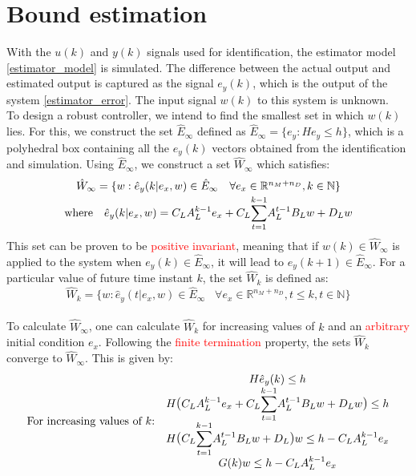 \documentclass[a4paper]{article}
\begin{document}
\section{Bound estimation}
With the $u(k)$ and $y(k)$ signals used for identification, the estimator model \eqref{estimator_model} is simulated. The difference between the actual output and estimated output is captured as the signal $e_y(k)$, which is the output of the system \eqref{estimator_error}. The input signal $w(k)$ to this system is unknown. \\
 To design a robust controller, we intend to find the smallest set in which $w(k)$ lies. For this, we construct the set $\hat{E}_\infty$ defined as $\hat{E}_\infty = \{e_y: He_y \leq h \}$, which is a polyhedral box containing all the $e_y(k)$ vectors obtained from the identification and simulation. Using $\hat{E}_\infty$, we construct a set $\hat{W}_\infty$ which satisfies:
 \begin{equation}
 \begin{matrix}
 \hat{W}_\infty = \{ w: \hat{e}_y(k|e_x,w) \in \hat{E}_\infty \hspace{10pt} \forall e_x \in \mathbb{R}^{n_M+n_D}, k \in \mathbb{N} \}\\ \vspace{-10pt} \\
 \text{where} \hspace{10pt}
 \hat{e}_y(k|e_x,w)= C_LA_L^{k-1}e_x+C_L\mathlarger{\sum}\limits_{t=1}^{k-1}A_L^{t-1}B_Lw+D_Lw
 \end{matrix}
 \end{equation}
This set can be proven to be \textcolor{red}{positive invariant}, meaning that if $w(k) \in \hat{W}_{\infty}$ is applied to the system when $e_y(k) \in \hat{E}_{\infty}$, it will lead to $e_y(k+1) \in \hat{E}_{\infty}$. For a particular value of future time instant $k$, the set $\hat{W}_{k}$ is defined as:
\begin{equation}
\hat{W}_k = \{w: \hat{e}_y(t|e_x,w) \in \hat{E}_{\infty} \hspace{10pt} \forall e_x \in \mathbb{R}^{n_M+n_D}, t \leq k, t \in \mathbb{N} \}
\end{equation}\\
To calculate $\hat{W}_{\infty}$, one can calculate $\hat{W}_k$ for increasing values of $k$ and an \textcolor{red}{arbitrary} initial condition $e_x$. Following the \textcolor{red}{finite termination} property, the sets $\hat{W}_{k}$ converge to $\hat{W}_{\infty}$. This is given by:
\begin{equation}
\begin{matrix}
\text{For increasing values of $k$:} &
\begin{matrix}
H\hat{e}_y(k) \leq h \\
H\text{\large{(}}C_LA_L^{k-1}e_x+C_L\mathlarger{\sum}\limits_{t=1}^{k-1}A_L^{t-1}B_Lw+D_Lw\text{\large{)}} \leq h \\
H\text{\large{(}}C_L\mathlarger{\sum}\limits_{t=1}^{k-1}A_L^{t-1}B_Lw+D_L\text{\large{)}}w \leq h-C_LA_L^{k-1}e_x \\
G(k)w \leq h-C_LA_L^{k-1}e_x
\end{matrix}
\end{matrix}
\end{equation}
\end{document}
